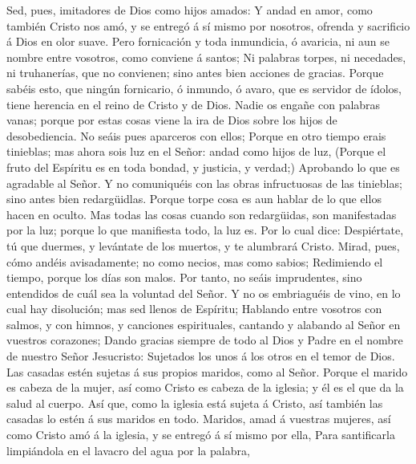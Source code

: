  Sed, pues, imitadores de Dios como hijos amados:
 Y andad en amor, como también Cristo nos amó, y se entregó
á sí mismo por nosotros, ofrenda y sacrificio á Dios en olor suave.
 Pero fornicación y toda inmundicia, ó avaricia, ni aun se
nombre entre vosotros, como conviene á santos;  Ni palabras
torpes, ni necedades, ni truhanerías, que no convienen; sino antes bien
acciones de gracias.  Porque sabéis esto, que ningún
fornicario, ó inmundo, ó avaro, que es servidor de ídolos, tiene
herencia en el reino de Cristo y de Dios.  Nadie os engañe
con palabras vanas; porque por estas cosas viene la ira de Dios sobre
los hijos de desobediencia.  No seáis pues aparceros con
ellos;  Porque en otro tiempo erais tinieblas; mas ahora
sois luz en el Señor: andad como hijos de luz,  (Porque el
fruto del Espíritu es en toda bondad, y justicia, y verdad;)
 Aprobando lo que es agradable al Señor.  Y no
comuniquéis con las obras infructuosas de las tinieblas; sino antes bien
redargüidlas.  Porque torpe cosa es aun hablar de lo que
ellos hacen en oculto.  Mas todas las cosas cuando son
redargüidas, son manifestadas por la luz; porque lo que manifiesta todo,
la luz es.  Por lo cual dice: Despiértate, tú que duermes,
y levántate de los muertos, y te alumbrará Cristo.  Mirad,
pues, cómo andéis avisadamente; no como necios, mas como sabios;
 Redimiendo el tiempo, porque los días son malos.
 Por tanto, no seáis imprudentes, sino entendidos de cuál
sea la voluntad del Señor.  Y no os embriaguéis de vino, en
lo cual hay disolución; mas sed llenos de Espíritu; 
Hablando entre vosotros con salmos, y con himnos, y canciones
espirituales, cantando y alabando al Señor en vuestros corazones;
 Dando gracias siempre de todo al Dios y Padre en el nombre
de nuestro Señor Jesucristo:  Sujetados los unos á los
otros en el temor de Dios.  Las casadas estén sujetas á sus
propios maridos, como al Señor.  Porque el marido es cabeza
de la mujer, así como Cristo es cabeza de la iglesia; y él es el que da
la salud al cuerpo.  Así que, como la iglesia está sujeta á
Cristo, así también las casadas lo estén á sus maridos en todo.
 Maridos, amad á vuestras mujeres, así como Cristo amó á la
iglesia, y se entregó á sí mismo por ella,  Para
santificarla limpiándola en el lavacro del agua por la palabra,
